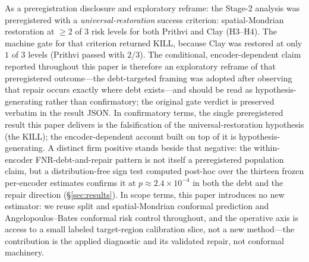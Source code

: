 \documentclass[journal]{IEEEtran}
\renewcommand{\_}{\textunderscore\allowbreak}
\begin{document}
As a preregistration disclosure and exploratory reframe: the Stage-2 analysis was preregistered
with a
\emph{universal-restoration} success criterion: spatial-Mondrian restoration at $\ge2$ of 3 risk levels for
both Prithvi and Clay (H3--H4). The machine gate for that criterion returned KILL, because
Clay was restored at only $1$ of $3$ levels (Prithvi passed with $2/3$). The conditional, encoder-dependent
claim reported throughout this paper is therefore an exploratory reframe of that preregistered
outcome---the debt-targeted framing was adopted after observing that repair occurs exactly where
debt exists---and should be read as hypothesis-generating rather than confirmatory; the original gate
verdict is preserved verbatim in the result JSON. In confirmatory terms, the single preregistered result this
paper delivers is the falsification of the universal-restoration hypothesis (the KILL); the
encoder-dependent account built on top of it is hypothesis-generating. A distinct firm positive stands
beside that negative: the within-encoder FNR-debt-and-repair pattern is not itself a preregistered
population claim, but a distribution-free sign test computed post-hoc over the thirteen frozen
per-encoder estimates confirms it at $p\approx2.4\times10^{-4}$ in both the debt and the repair
direction (\S\ref{sec:results}). In scope terms, this paper
introduces no new estimator: we reuse split and spatial-Mondrian conformal prediction
\citep{vovk2005algorithmic,vovk2003mondrian} and Angelopoulos--Bates conformal risk control
\citep{angelopoulos2024crc} throughout, and the operative axis is access to a small labeled target-region
calibration slice, not a new method---the contribution is the applied diagnostic and its validated repair,
not conformal machinery.
\end{document}
